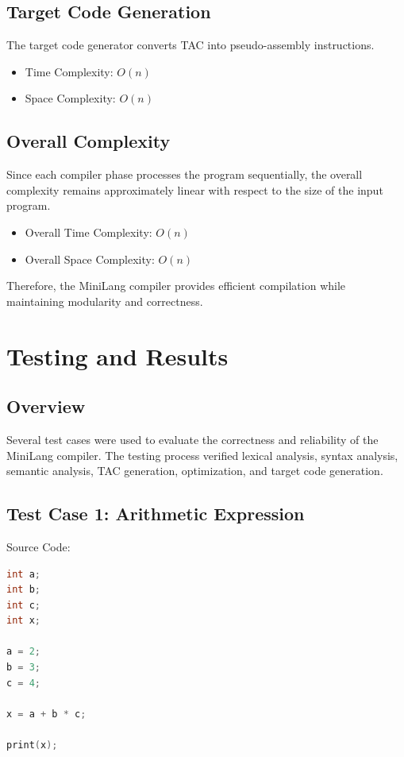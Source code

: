 \documentclass[12pt,a4paper]{report}
\begin{document}
\section{Target Code Generation}

The target code generator converts TAC into pseudo-assembly instructions.

\begin{itemize}
    \item Time Complexity: \(O(n)\)
    \item Space Complexity: \(O(n)\)
\end{itemize}

\section{Overall Complexity}

Since each compiler phase processes the program sequentially, the overall complexity remains approximately linear with respect to the size of the input program.

\begin{itemize}
    \item Overall Time Complexity: \(O(n)\)
    \item Overall Space Complexity: \(O(n)\)
\end{itemize}

Therefore, the MiniLang compiler provides efficient compilation while maintaining modularity and correctness.

\chapter{Testing and Results}

\section{Overview}

Several test cases were used to evaluate the correctness and reliability of the MiniLang compiler. The testing process verified lexical analysis, syntax analysis, semantic analysis, TAC generation, optimization, and target code generation.

\section{Test Case 1: Arithmetic Expression}

Source Code:

\begin{lstlisting}[language=C]
int a;
int b;
int c;
int x;

a = 2;
b = 3;
c = 4;

x = a + b * c;

print(x);
\end{lstlisting}
\end{document}
